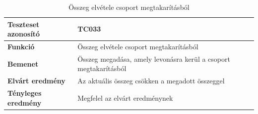 \begin{table}[h!]
	\centering
	\begin{tabular}{|l|p{10cm}|}
		\hline
		\textbf{Teszteset azonosító} & TC033 \\ \hline
		\textbf{Funkció} & Összeg elvétele csoport megtakarításból \\ \hline
		\textbf{Bemenet} & Összeg megadása, amely levonásra kerül a csoport megtakarításból \\ \hline
		\textbf{Elvárt eredmény} & Az aktuális összeg csökken a megadott összeggel \\ \hline
		\textbf{Tényleges eredmény} & Megfelel az elvárt eredménynek \\ \hline
	\end{tabular}
	\caption{Összeg elvétele csoport megtakarításból}
	\label{tab:csoport_megtakaritas_elvetel}
\end{table}

